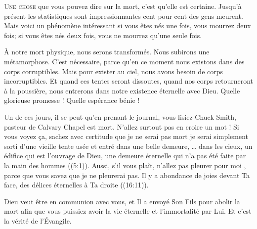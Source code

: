 
\lettrine{U}{ne chose} que vous pouvez dire sur la mort,
 c'est qu'elle est certaine.
 Jusqu'à présent les statistiques sont impressionnantes\frcolon
 cent pour cent des gens meurent. Mais voici un phénomène intéressant\frcolon
 si vous êtes nés une fois, vous mourrez deux fois;
 si vous êtes nés deux fois, vous ne mourrez qu'une seule fois.

À notre mort physique, nous serons transformés.
 Nous subirons une métamorphose. C'est nécessaire, parce qu'en ce moment
 nous existons dans des corps corruptibles. Mais pour exister au ciel,
 nous avons besoin de corps incorruptibles. Et quand ces tentes
 seront dissoutes, quand nos corps retourneront à la poussière,
 nous entrerons dans notre existence éternelle avec Dieu.
 Quelle glorieuse promesse ! Quelle espérance bénie ! 


Un de ces jours, il se peut qu'en prenant le journal,
 vous lisiez\frcolon {}
 \Og Chuck Smith, pasteur de Calvary Chapel est mort. \Fg{}
 N'allez surtout pas en croire un mot ! Si vous voyez \c{c}a,
 sachez avec certitude que je ne serai pas mort \ocadr je serai simplement
 sorti d'une vieille tente usée et entré dans une belle demeure,
 \Og \dots{} 
 dans les cieux, un édifice qui est l'ouvrage de Dieu, une demeure éternelle
 qui n'a pas été faite par la main des hommes \Fg{} ((5:1)).
 Aussi, s'il vous plaît, n'allez pas pleurer pour moi
 , parce que vous savez que je ne pleurerai pas.
 \Og Il y a abondance de joies devant Ta face, des délices éternelles
 à Ta droite \Fg{} ((16:11)). 

Dieu veut être en communion avec vous, et Il a envoyé Son Fils pour abolir
 la mort afin que vous puissiez avoir la vie éternelle
 et l'immortalité par Lui. Et c'est la vérité de l'Évangile.

\dvrule



